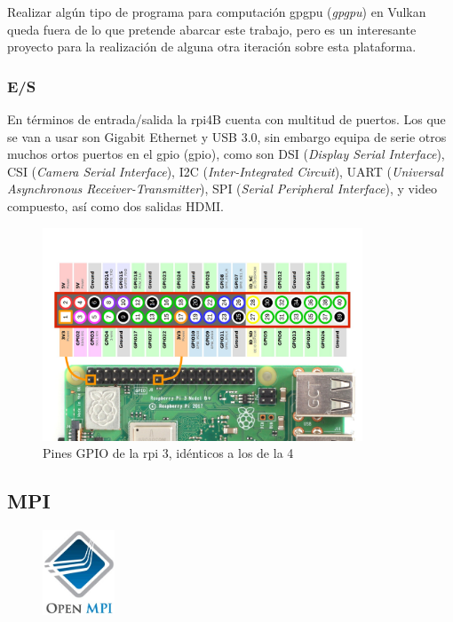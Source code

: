 Realizar algún tipo de programa para computación \acrshort{gpgpu} (\textit{\acrlong{gpgpu}}) en Vulkan queda fuera de lo que pretende abarcar este trabajo, pero es un interesante proyecto para la realización de alguna otra iteración sobre esta plataforma.

\subsubsection{E/S}
En términos de entrada/salida la \acrshort{rpi}4B cuenta con multitud de puertos. Los que se van a usar son Gigabit Ethernet y USB 3.0, sin embargo equipa de serie otros muchos ortos puertos en el \acrshort{gpio} (\acrlong{gpio}), como son DSI (\textit{Display Serial Interface}), CSI (\textit{Camera Serial Interface}), I2C (\textit{Inter-Integrated Circuit}), UART (\textit{Universal Asynchronous Receiver-Transmitter}), SPI (\textit{Serial Peripheral Interface}), y video compuesto, así como dos salidas HDMI.

\begin{figure}[h!]
  \centering
  \includegraphics[width=0.85\textwidth]{img/rpi_parts/rpi_gpio.png}
  \caption{Pines GPIO de la \acrlong{rpi} 3, idénticos a los de la 4}
  \label{fig:rpi_gpio_pinout}
\end{figure}

\subsection{MPI}
\begin{figure}
  \centering
  \includegraphics[width=0.19\textwidth]{img/ompi_logo_2.png}
  \label{fig:rpi_cpu}
\end{figure} 

